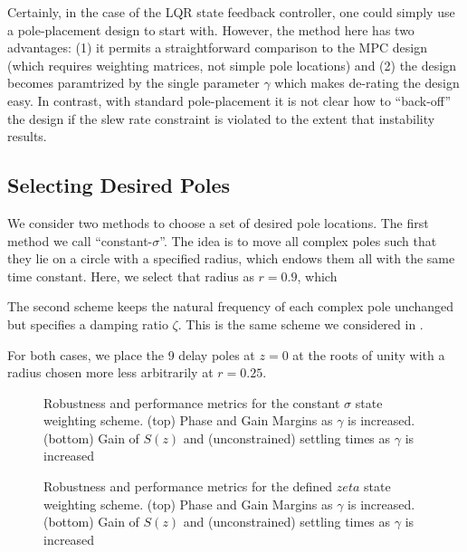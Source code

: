 \documentclass[journal,twocolumn,twoside]{IEEEtran}
\begin{document}
Certainly, in the case of the LQR state feedback controller, one could simply use a pole-placement design to start with. However, the method here has two advantages: (1) it permits a straightforward comparison to the MPC design (which requires weighting matrices, not simple pole locations) and (2) the design becomes paramtrized by the single parameter $\gamma$ which makes de-rating the design easy. In contrast, with standard pole-placement it is not clear how to ``back-off'' the design if the slew rate constraint is violated to the extent that instability results. 


\subsection{Selecting Desired Poles}
We consider two methods to choose a set of desired pole locations. The first method we call ``constant-$\sigma$''. The idea is to move all complex poles such that they lie on a circle with a specified radius, which endows them all with the same time constant. Here, we select that radius as $r=0.9$, which 

The second scheme keeps the natural frequency of each complex pole unchanged but specifies a damping ratio $\zeta$. This is the same scheme we considered in \cite{braker_fast_2017, braker_application_2017}.

For both cases, we place the 9 delay poles at $z=0$ at the roots of unity with a radius chosen more less arbitrarily at $r=0.25$. 

\begin{figure*}
  \begin{minipage}{0.48\textwidth}
    
    \caption{Robustness and performance metrics for the constant $\sigma$ state weighting scheme. (top) Phase and Gain Margins as $\gamma$ is increased. (bottom) Gain of $S(z)$ and (unconstrained) settling times as $\gamma$ is increased}
\label{fig:gmpm}
  \end{minipage}
  \hfil
  \begin{minipage}{0.48\textwidth}
    
    \caption{Robustness and performance metrics for the defined $zeta$ state weighting scheme. (top) Phase and Gain Margins as $\gamma$ is increased. (bottom) Gain of $S(z)$ and (unconstrained) settling times as $\gamma$ is increased}
    \label{fig:GainS}
  \end{minipage}
\end{figure*}
\end{document}
